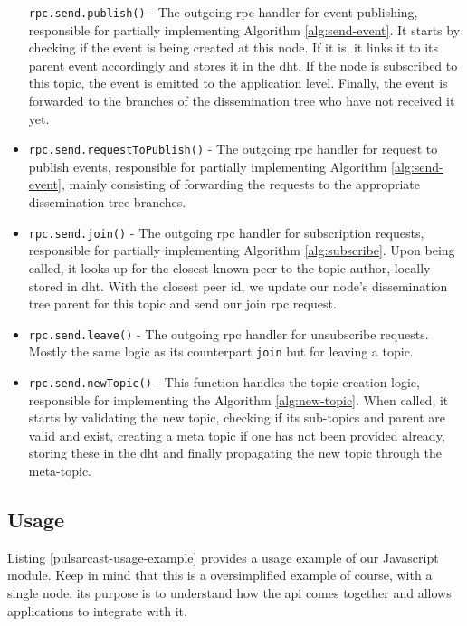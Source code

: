 \begin{itemize}
    \verb|rpc.send.publish()| - The outgoing \acrshort{rpc} handler for event publishing, responsible for partially implementing Algorithm \ref{alg:send-event}. It starts by checking if the event is being created at this node. If it is, it links it to its parent event accordingly and stores it in the \acrshort{dht}. If the node is subscribed to this topic, the event is emitted to the application level. Finally, the event is forwarded to the branches of the dissemination tree who have not received it yet.
  \item
    \verb|rpc.send.requestToPublish()| - The outgoing \acrshort{rpc} handler for request to publish events, responsible for partially implementing Algorithm \ref{alg:send-event}, mainly consisting of forwarding the requests to the appropriate dissemination tree branches.
  \item
    \verb|rpc.send.join()| - The outgoing \acrshort{rpc} handler for subscription requests, responsible for partially implementing Algorithm \ref{alg:subscribe}. Upon being called, it looks up for the closest known peer to the topic author, locally stored in \acrshort{dht}. With the closest peer id, we update our node's dissemination tree parent for this topic and send our join \acrshort{rpc} request.
  \item
    \verb|rpc.send.leave()| - The outgoing \acrshort{rpc} handler for unsubscribe requests. Mostly the same logic as its counterpart \verb|join| but for leaving a topic.
  \item
    \verb|rpc.send.newTopic()| - This function handles the topic creation logic, responsible for implementing the Algorithm \ref{alg:new-topic}.  When called, it starts by validating the new topic, checking if its sub-topics and parent are valid and exist, creating a meta topic if one has not been provided already, storing these in the \acrshort{dht} and finally propagating the new topic through the meta-topic.
\end{itemize}

\subsection{Usage}\label{subsec:usage}

Listing \ref{pulsarcast-usage-example} provides a usage example of our
Javascript module. Keep in mind that this is a oversimplified example of
course, with a single node, its purpose is to understand how the \acrshort{api} comes
together and allows applications to integrate with it.

